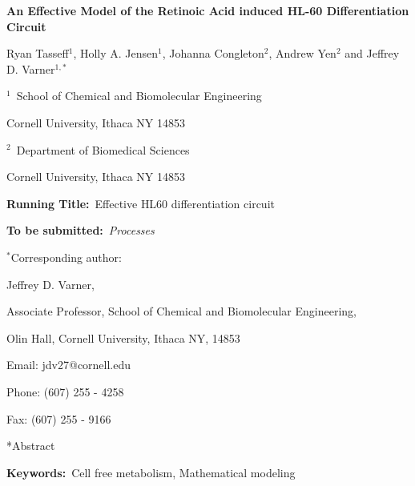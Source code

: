 \documentclass[12pt]{article}
\makeatletter
\renewcommand\section{\@startsection
	{subsection}{2}{0mm}
	{-0.2in}
	{0.05\baselineskip}
	{\normalfont\large\bfseries}}
\makeatother
\begin{document}
\begin{titlepage}
{\par\centering\textbf{\Large An Effective Model of the Retinoic Acid induced HL-60 Differentiation Circuit}}
\vspace{0.05in}
{\par \centering \large{Ryan Tasseff$^{1}$, 
Holly A. Jensen$^{1}$, 
Johanna Congleton$^{2}$, Andrew Yen$^{2}$ and Jeffrey D. Varner$^{1,*}$}}
\vspace{0.10in}
{\par \centering \large{$^{1}$~School of Chemical and Biomolecular Engineering}}
{\par \centering \large{Cornell University, Ithaca NY 14853}}
\vspace{0.1in}
{\par \centering \large{$^{2}$~Department of Biomedical Sciences}}
{\par \centering \large{Cornell University, Ithaca NY 14853}}
\vspace{0.1in}
{\par \centering \textbf{Running Title:}~Effective HL60 differentiation circuit}
\vspace{0.1in}
{\par \centering \textbf{To be submitted:}~\emph{Processes}}
\vspace{0.5in}
{\par \centering $^{*}$Corresponding author:}
{\par \centering Jeffrey D. Varner,}
{\par \centering Associate Professor, School of Chemical and Biomolecular Engineering,}
{\par {} Olin Hall, Cornell University, Ithaca NY, 14853} 
{\par \centering Email: jdv27@cornell.edu} 
{\par \centering Phone: (607) 255 - 4258}
{\par \centering Fax: (607) 255 - 9166}
\end{titlepage}
\date{}
\thispagestyle{empty}
\pagebreak
\section*{Abstract}

{\noindent \textbf{Keywords:}~Cell free metabolism, Mathematical modeling}
\end{document}
